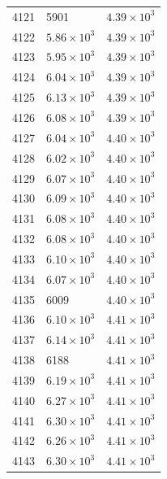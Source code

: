 \begin{table}[H]
\begin{tabular}{lll}
4121 & 5901 & $\displaystyle 4.39 \times 10^{3}$ \\
4122 & $\displaystyle 5.86 \times 10^{3}$ & $\displaystyle 4.39 \times 10^{3}$ \\
4123 & $\displaystyle 5.95 \times 10^{3}$ & $\displaystyle 4.39 \times 10^{3}$ \\
4124 & $\displaystyle 6.04 \times 10^{3}$ & $\displaystyle 4.39 \times 10^{3}$ \\
4125 & $\displaystyle 6.13 \times 10^{3}$ & $\displaystyle 4.39 \times 10^{3}$ \\
4126 & $\displaystyle 6.08 \times 10^{3}$ & $\displaystyle 4.39 \times 10^{3}$ \\
4127 & $\displaystyle 6.04 \times 10^{3}$ & $\displaystyle 4.40 \times 10^{3}$ \\
4128 & $\displaystyle 6.02 \times 10^{3}$ & $\displaystyle 4.40 \times 10^{3}$ \\
4129 & $\displaystyle 6.07 \times 10^{3}$ & $\displaystyle 4.40 \times 10^{3}$ \\
4130 & $\displaystyle 6.09 \times 10^{3}$ & $\displaystyle 4.40 \times 10^{3}$ \\
4131 & $\displaystyle 6.08 \times 10^{3}$ & $\displaystyle 4.40 \times 10^{3}$ \\
4132 & $\displaystyle 6.08 \times 10^{3}$ & $\displaystyle 4.40 \times 10^{3}$ \\
4133 & $\displaystyle 6.10 \times 10^{3}$ & $\displaystyle 4.40 \times 10^{3}$ \\
4134 & $\displaystyle 6.07 \times 10^{3}$ & $\displaystyle 4.40 \times 10^{3}$ \\
4135 & 6009 & $\displaystyle 4.40 \times 10^{3}$ \\
4136 & $\displaystyle 6.10 \times 10^{3}$ & $\displaystyle 4.41 \times 10^{3}$ \\
4137 & $\displaystyle 6.14 \times 10^{3}$ & $\displaystyle 4.41 \times 10^{3}$ \\
4138 & 6188 & $\displaystyle 4.41 \times 10^{3}$ \\
4139 & $\displaystyle 6.19 \times 10^{3}$ & $\displaystyle 4.41 \times 10^{3}$ \\
4140 & $\displaystyle 6.27 \times 10^{3}$ & $\displaystyle 4.41 \times 10^{3}$ \\
4141 & $\displaystyle 6.30 \times 10^{3}$ & $\displaystyle 4.41 \times 10^{3}$ \\
4142 & $\displaystyle 6.26 \times 10^{3}$ & $\displaystyle 4.41 \times 10^{3}$ \\
4143 & $\displaystyle 6.30 \times 10^{3}$ & $\displaystyle 4.41 \times 10^{3}$ \\

\end{tabular}
\end{table}
